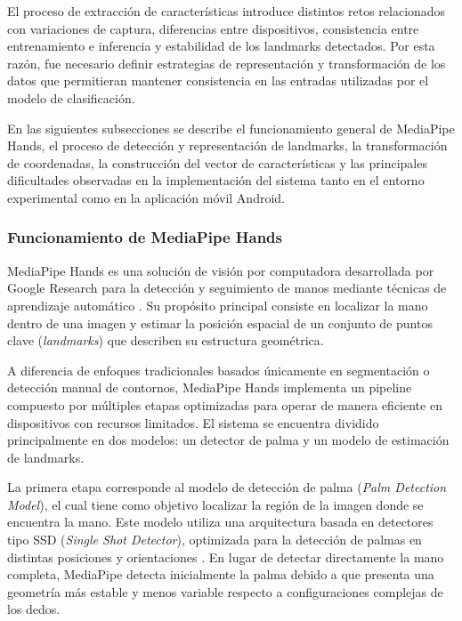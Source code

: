	El proceso de extracción de características introduce distintos retos
	relacionados con variaciones de captura, diferencias entre dispositivos,
	consistencia entre entrenamiento e inferencia y estabilidad de los landmarks
	detectados. Por esta razón, fue necesario definir estrategias de representación y
	transformación de los datos que permitieran mantener consistencia en las entradas
	utilizadas por el modelo de clasificación.
	
	En las siguientes subsecciones se describe el funcionamiento general de
	MediaPipe Hands, el proceso de detección y representación de landmarks, la
	transformación de coordenadas, la construcción del vector de características y las
	principales dificultades observadas en la implementación del sistema tanto en
	el entorno experimental como en la aplicación móvil Android.
	
	\subsubsection{Funcionamiento de MediaPipe Hands}
	
	MediaPipe Hands es una solución de visión por computadora desarrollada por Google
	Research para la detección y seguimiento de manos mediante técnicas de aprendizaje
	automático \cite{mediapipeHandsPaper}. Su propósito principal consiste en localizar
	la mano dentro de una imagen y estimar la posición espacial de un conjunto de
	puntos clave (\textit{landmarks}) que describen su estructura geométrica.
	
	A diferencia de enfoques tradicionales basados únicamente en segmentación o
	detección manual de contornos, MediaPipe Hands implementa un pipeline compuesto
	por múltiples etapas optimizadas para operar de manera eficiente en dispositivos
	con recursos limitados. El sistema se encuentra dividido principalmente en dos
	modelos: un detector de palma y un modelo de estimación de landmarks.
	
	La primera etapa corresponde al modelo de detección de palma
	(\textit{Palm Detection Model}), el cual tiene como objetivo localizar la región
	de la imagen donde se encuentra la mano. Este modelo utiliza una arquitectura
	basada en detectores tipo SSD (\textit{Single Shot Detector}), optimizada para la
	detección de palmas en distintas posiciones y orientaciones
	\cite{mediapipeHandsPaper}. En lugar de detectar directamente la mano completa,
	MediaPipe detecta inicialmente la palma debido a que presenta una geometría más
	estable y menos variable respecto a configuraciones complejas de los dedos.
	
